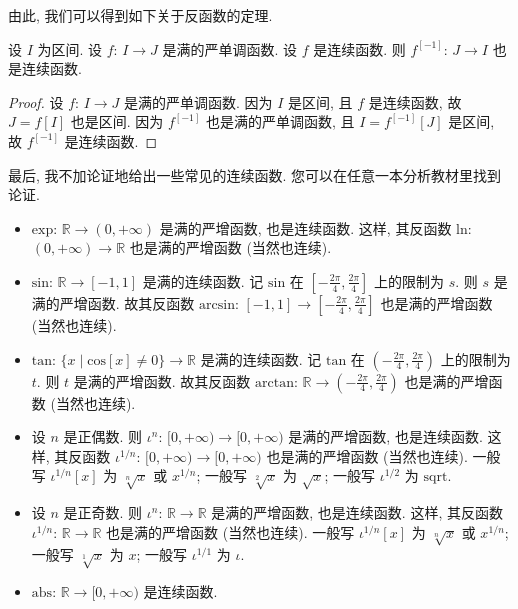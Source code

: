 由此, 我们可以得到如下关于反函数的定理.

\begin{theorem}
    设 $I$ 为区间.
    设 $f$: $I \to J$ 是满的严单调函数.
    设 $f$ 是连续函数.
    则 $f^{[-1]}$: $J \to I$ 也是连续函数.
\end{theorem}

\begin{proof}
    设 $f$: $I \to J$ 是满的严单调函数.
    因为 $I$ 是区间, 且 $f$ 是连续函数,
    故 $J = f[I]$ 也是区间.
    因为 $f^{[-1]}$ 也是满的严单调函数,
    且 $I = f^{[-1]} [J]$ 是区间,
    故 $f^{[-1]}$ 是连续函数.
\end{proof}

最后, 我不加论证地给出一些常见的连续函数.
您可以在任意一本分析教材里找到论证.
\begin{itemize}
    \item $\mathrm{exp}$: $\mathbb{R} \to (0, +\infty)$
          是满的严增函数, 也是连续函数.
          这样, 其反函数
          $\mathrm{ln}$: $(0, +\infty) \to \mathbb{R}$
          也是满的严增函数 (当然也连续).
    \item $\mathrm{sin}$: $\mathbb{R} \to [-1, 1]$
          是满的连续函数.
          记 $\mathrm{sin}$ 在
          $[-\frac{2\pi}{4}, \frac{2\pi}{4}]$ 上的限制为 $s$.
          则 $s$ 是满的严增函数.
          故其反函数
          $\mathrm{arcsin}$: $[-1, 1] \to [-\frac{2\pi}{4}, \frac{2\pi}{4}]$
          也是满的严增函数 (当然也连续).
    \item $\mathrm{tan}$: $\{ x \mid \mathrm{cos}[x] \neq 0 \} \to \mathbb{R}$
          是满的连续函数.
          记 $\mathrm{tan}$ 在
          $(-\frac{2\pi}{4}, \frac{2\pi}{4})$
          上的限制为 $t$.
          则 $t$ 是满的严增函数.
          故其反函数
          $\mathrm{arctan}$: $\mathbb{R} \to (-\frac{2\pi}{4}, \frac{2\pi}{4})$
          也是满的严增函数 (当然也连续).
    \item 设 $n$ 是正偶数.
          则
          $\iota^n$: $[0, +\infty) \to [0, +\infty)$
          是满的严增函数, 也是连续函数.
          这样, 其反函数
          $\iota^{1/n}$: $[0, +\infty) \to [0, +\infty)$
          也是满的严增函数 (当然也连续).
          一般写 $\iota^{1/n} [x]$ 为 $\sqrt[n]{x}$ 或 $x^{1/n}$;
          一般写 $\sqrt[2]{x}$ 为 $\sqrt{x}$;
          一般写 $\iota^{1/2}$ 为 $\mathrm{sqrt}$.
    \item 设 $n$ 是正奇数.
          则
          $\iota^n$: $\mathbb{R} \to \mathbb{R}$
          是满的严增函数, 也是连续函数.
          这样, 其反函数
          $\iota^{1/n}$: $\mathbb{R} \to \mathbb{R}$
          也是满的严增函数 (当然也连续).
          一般写 $\iota^{1/n} [x]$ 为 $\sqrt[n]{x}$ 或 $x^{1/n}$;
          一般写 $\sqrt[1]{x}$ 为 $x$;
          一般写 $\iota^{1/1}$ 为 $\iota$.
    \item $\mathrm{abs}$: $\mathbb{R} \to [0, +\infty)$
          是连续函数.
\end{itemize}

